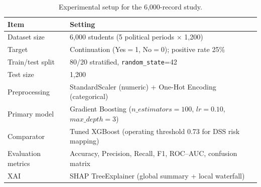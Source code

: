 %

\begin{table}[htbp]
\centering
\caption{Experimental setup for the 6{,}000-record study.}
\label{tab:experimental_setup}
\begin{tabular}{lp{8.8cm}}
\toprule
\textbf{Item} & \textbf{Setting} \\
\midrule
Dataset size & 6{,}000 students (5 political periods $\times$ 1{,}200) \\
Target & Continuation (Yes$=$1, No$=$0); positive rate 25\% \\
Train/test split & 80/20 stratified, \texttt{random\_state}=42 \\
Test size & 1{,}200 \\
Preprocessing & StandardScaler (numeric) + One-Hot Encoding (categorical) \\
Primary model & Gradient Boosting ($n\_estimators=100$, $lr=0.10$, $max\_depth=3$) \\
Comparator & Tuned XGBoost (operating threshold 0.73 for DSS risk mapping) \\
Evaluation metrics & Accuracy, Precision, Recall, F1, ROC--AUC, confusion matrix \\
XAI & SHAP TreeExplainer (global summary + local waterfall) \\
\bottomrule
\end{tabular}
\end{table}


